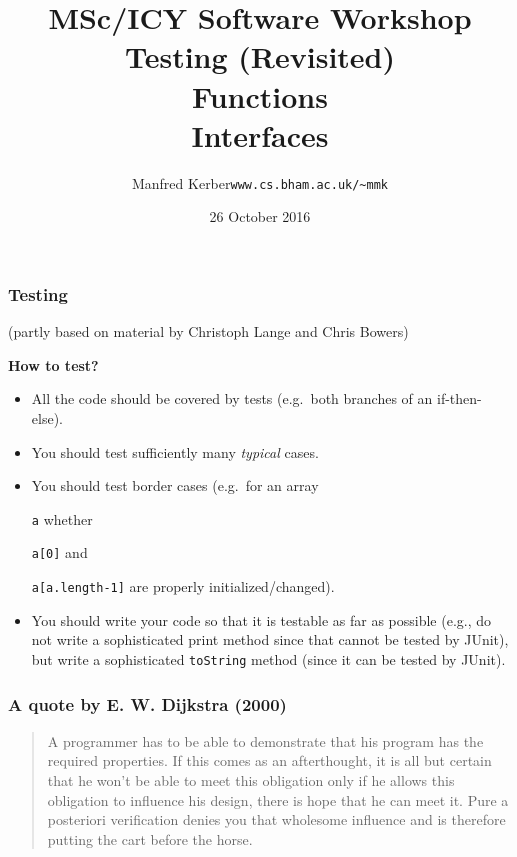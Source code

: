 \documentclass{beamer}
\def\mytoday{26 October 2016}
\def\mcolor#1#2{\rule{0ex}{0ex}\color{#1}#2\color{black}{}}
\begin{document}
\title{MSc/ICY Software Workshop\\
Testing (Revisited)\\Functions\\Interfaces}

\author[Manfred~Kerber]{\begin{tabular}{ll}
\mcolor{blue}{Manfred Kerber} &   {\tt www.cs.bham.ac.uk/\~{}mmk}\\
\end{tabular}}

\date{\mytoday}

\begin{frame}
\titlepage
\end{frame}

\begin{frame}
\frametitle{Testing}
(partly based on material by Christoph Lange and Chris Bowers)\bigskip

\mcolor{blue}{\textbf{How to test?}}\bigskip

\begin{itemize}
\item All the code should be covered by tests
      (e.g.\ both branches of an if-then-else).
\item You should test sufficiently many \textit{typical} cases.
\item You should test border cases (e.g.\ for an array
  \mcolor{blue}{\texttt{a}} whether \mcolor{blue}{\texttt{a[0]}} and
  \mcolor{blue}{\texttt{a[a.length-1]}} are properly
  initialized/changed).
\item You should write your code so that it is testable as far as
  possible (e.g., do not write a sophisticated print method since
  that cannot be tested by JUnit), but write a sophisticated \texttt{toString}
  method (since it can be tested by JUnit).
\end{itemize} %
\end{frame}

\begin{frame}
\frametitle{A quote by E. W. Dijkstra (2000)}
\begin{quote} %
  \mcolor{blue}{A programmer has to be able to demonstrate that his
    program has the required properties. If this comes as an
    afterthought, it is all but certain that he won't be able to meet
    this obligation only if he allows this obligation to influence his
    design, there is hope that he can meet it. Pure a posteriori
    verification denies you that wholesome influence and is therefore
    putting the cart before the horse.}
\end{quote}
\end{frame}
\end{document}
